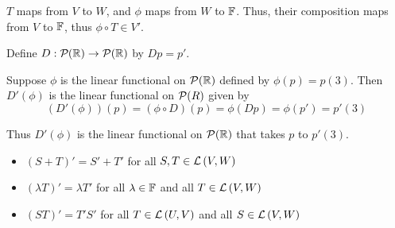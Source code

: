 $T$ maps from $V$ to $W$, and $\phi$ maps from $W$ to $\operatorname{\mathbb{F}}$.
Thus, their composition maps from $V$ to $\operatorname{\mathbb{F}}$, thus $\phi \circ T \in V'$.

\begin{example}
   Define $D : \Polys{\R}{\empty} \to \PolysAll{\R}$ by $Dp = p'$.
   
   Suppose $\phi$ is the linear functional on $\mathcal{P}(\operatorname{\mathbb{R}})$ defined
   by $\phi(p) = p(3)$.
   Then $D'(\phi)$ is the linear functional on $\mathcal{P}(R)$ given by
   \[ (D'(\phi))(p) = (\phi \circ D)(p) = \phi(Dp) = \phi(p') = p'(3) \]

   Thus $D'(\phi)$ is the linear functional on $\mathcal{P}(\operatorname{\mathbb{R}})$ that takes
   $p$ to $p'(3)$.
\end{example}

\begin{theorem} 
   \begin{itemize}
      \item $(S + T)' = S' + T'$ for all $S, T \in \mathcal{L} \left( V, W \right)$
      \item $(\lambda T)' = \lambda T'$ for all $\lambda \in \operatorname{\mathbb{F}}$ and all $T \in \mathcal{L} \left( V, W \right)$
      \item $(ST)' = T'S'$ for all $T \in \mathcal{L} \left( U, V \right)$ and all $S \in \mathcal{L} \left( V, W \right)$
   \end{itemize}
\end{theorem}
\endinput